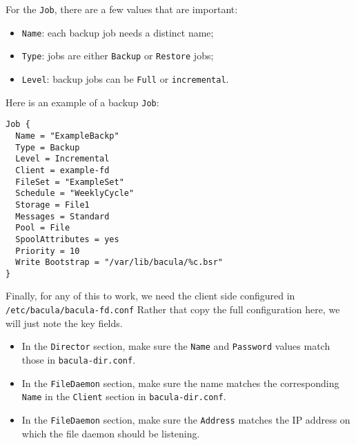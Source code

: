 \documentclass{article}   	%
\begin{document}
For the \texttt{Job}, there are a few values that are important:

\begin{itemize}
	\item \texttt{Name}: each backup job needs a distinct name;
	\item \texttt{Type}: jobs are either \texttt{Backup} or \texttt{Restore} jobs;
	\item \texttt{Level}: backup jobs can be \texttt{Full} or \texttt{incremental}.	
\end{itemize}

Here is an example of a backup \texttt{Job}:

\begin{verbatim}
Job {
  Name = "ExampleBackp"
  Type = Backup
  Level = Incremental
  Client = example-fd
  FileSet = "ExampleSet"
  Schedule = "WeeklyCycle"
  Storage = File1
  Messages = Standard
  Pool = File
  SpoolAttributes = yes
  Priority = 10
  Write Bootstrap = "/var/lib/bacula/%c.bsr"
}

\end{verbatim}

Finally, for any of this to work, we need the client side configured in \texttt{/etc/bacula/bacula-fd.conf} Rather that copy the full configuration here, we will just note the 
key fields.

\begin{itemize}
  \item In the \texttt{Director} section, make sure the \texttt{Name} and \texttt{Password} values match those in \texttt{bacula-dir.conf}.
  \item In the \texttt{FileDaemon} section, make sure the name matches the corresponding \texttt{Name} in the \texttt{Client} section
  in \texttt{bacula-dir.conf}.
  \item In the \texttt{FileDaemon} section, make sure the \texttt{Address} matches the IP address on which the file daemon should be listening.
\end{itemize}
\end{document}
